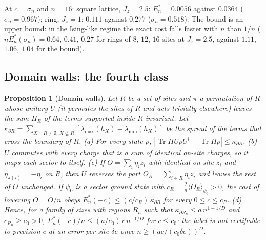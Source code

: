 \documentclass[aps,prx,onecolumn,10pt,nofootinbib,longbibliography,floatfix]{revtex4-2}
\newtheorem{proposition}{Proposition}
\theoremstyle{remark}
\newcommand{\Jz}{J_z}
\newcommand{\de}{\delta e}
\newcommand{\Tr}{\operatorname{Tr}}
\begin{document}
At $c=\sigma_n$ and $n=16$: square lattice, $\Jz=2.5$: $E^*_n=0.0056$ against $0.0364$ %
($\sigma_n=0.967$); ring, $\Jz=1$: $0.111$ against $0.277$ ($\sigma_n=0.518$). The bound is an upper bound: in the %
Ising-like regime the exact cost falls faster with $n$ than $1/n$ ($n E^*_n(\sigma_n)=0.64$, $0.41$, $0.27$ for %
rings of $8$, $12$, $16$ sites at $\Jz=2.5$, against $1.11$, $1.06$, $1.04$ for the bound). %

\subsection{Domain walls: the fourth class}
\label{sm:wall}

\begin{proposition}[Domain walls]
\label{prop:wall}
Let $R$ be a set of sites and $\pi$ a permutation of $R$ whose unitary $U$ (it permutes the sites of $R$ and acts
trivially elsewhere) leaves the sum $H_R$ of the terms supported inside $R$ invariant. Let
$\kappa_{\partial R}=\sum_{X\cap R\neq\emptyset,\,X\not\subseteq R}[\lambda_{\max}(h_X)-\lambda_{\min}(h_X)]$ be the
spread of the terms that cross the boundary of $R$.
(a) For every state $\rho$, $|\Tr HU\rho U^\dagger-\Tr H\rho|\le\kappa_{\partial R}$.
(b) $U$ commutes with every charge that is a sum of identical on-site charges, so it maps each sector to itself.
(c) If $O=\sum_i\eta_iz_i$ with identical on-site $z_i$ and $\eta_{\pi(i)}=-\eta_i$ on $R$, then $U$ reverses the
part $O_R=\sum_{i\in R}\eta_iz_i$ and leaves the rest of $O$ unchanged. If $\psi_0$ is a sector ground state with
$c_R=\frac2n\langle O_R\rangle_{\psi_0}>0$, the cost of lowering $\bar O=O/n$ obeys
$E^*_n(-c)\le(c/c_R)\,\kappa_{\partial R}$ for every $0\le c\le c_R$.
(d) Hence, for a family of sizes with regions $R_n$ such that $\kappa_{\partial R_n}\le a\,n^{1-1/D}$ and
$c_{R_n}\ge c_0>0$, $E^*_n(-c)/n\le(a/c_0)\,c\,n^{-1/D}$ for $c\le c_0$: the label is not certifiable to precision
$c$ at an error per site $\de$ once $n\ge(ac/(c_0\de))^{D}$.
\end{proposition}
\end{document}
